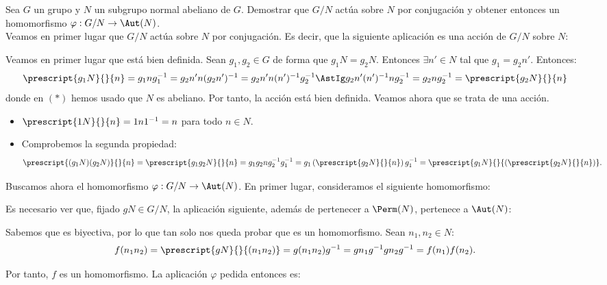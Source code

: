 \begin{ejercicio}\label{ej:6.2}
    Sea $G$ un grupo y $N$ un subgrupo normal abeliano de $G$. Demostrar que $G/N$ actúa sobre $N$ por conjugación y obtener entonces un homomorfismo $\varphi: G/N \to \Aut(N)$.\\

    Veamos en primer lugar que $G/N$ actúa sobre $N$ por conjugación. Es decir, que la siguiente aplicación es una acción de $G/N$ sobre $N$:

    Veamos en primer lugar que está bien definida. Sean $g_1, g_2 \in G$ de forma que $g_1N = g_2N$. Entonces $\exists n'\in N$ tal que $g_1 = g_2n'$. Entonces:
    \begin{align*}
        \prescript{g_1N}{}{n} &= g_1ng_1^{-1} = g_2n' n (g_2n')^{-1} = g_2n' n (n')^{-1}g_2^{-1} \AstIg g_2 n'(n')^{-1} n g_2^{-1} = g_2 n g_2^{-1}
        = \prescript{g_2N}{}{n}
    \end{align*}
    donde en $(\ast)$ hemos usado que $N$ es abeliano. Por tanto, la acción está bien definida. Veamos ahora que se trata de una acción.
    \begin{itemize}
        \item $\prescript{1N}{}{n} = 1n1^{-1} = n$ para todo $n \in N$.
        \item Comprobemos la segunda propiedad:
        \begin{align*}
            \prescript{(g_1N)(g_2N)}{}{n} &= \prescript{g_1g_2N}{}{n} = g_1g_2ng_2^{-1}g_1^{-1} = g_1 \left(\prescript{g_2N}{}{n}\right) g_1^{-1}
            = \prescript{g_1N}{}{\left(\prescript{g_2N}{}{n}\right)}.
        \end{align*}
    \end{itemize}

    Buscamos ahora el homomorfismo $\varphi: G/N \to \Aut(N)$. En primer lugar, consideramos el siguiente homomorfismo:


    Es necesario ver que, fijado $gN \in G/N$, la aplicación siguiente, además de pertenecer a $\Perm(N)$, pertenece a $\Aut(N)$:

    Sabemos que es biyectiva, por lo que tan solo nos queda probar que es un homomorfismo. Sean $n_1, n_2 \in N$:
    \begin{align*}
        f(n_1n_2) &= \prescript{gN}{}{(n_1n_2)} = g(n_1n_2)g^{-1} = g n_1 g^{-1} g n_2 g^{-1} = f(n_1)f(n_2).
    \end{align*}

    Por tanto, $f$ es un homomorfismo. La aplicación $\varphi$ pedida entonces es:
\end{ejercicio}

